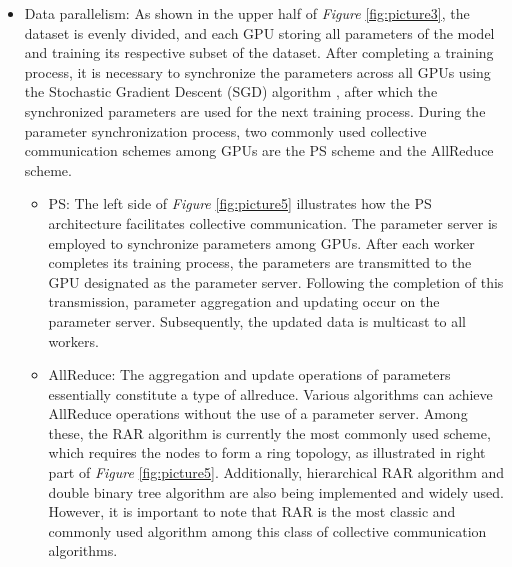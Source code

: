 \documentclass[conference]{IEEEtran}
\begin{document}
\begin{itemize}
	
	\item Data parallelism: As shown in the upper half of \emph{Figure} \ref{fig:picture3}, the dataset is evenly divided, and each GPU storing all parameters of the model and training its respective subset of the dataset. After completing a training process, it is necessary to synchronize the parameters across all GPUs using the Stochastic Gradient Descent (SGD) algorithm \cite{SGD2010}, after which the synchronized parameters are used for the next training process. During the parameter synchronization process, two commonly used collective communication schemes among GPUs are the PS scheme and the AllReduce scheme.
	
	\begin{itemize}
		
		\item PS: The left side of \emph{Figure} \ref{fig:picture5} illustrates how the PS architecture facilitates collective communication. The parameter server is employed to synchronize parameters among GPUs. After each worker completes its training process, the parameters are transmitted to the GPU designated as the parameter server. Following the completion of this transmission, parameter aggregation and updating occur on the parameter server. Subsequently, the updated data is multicast to all workers.
		
		
		\item AllReduce: The aggregation and update operations of parameters essentially constitute a type of allreduce. Various algorithms can achieve AllReduce operations without the use of a parameter server. Among these, the RAR algorithm is currently the most commonly used scheme, which requires the nodes to form a ring topology, as illustrated in right part of \emph{Figure} \ref{fig:picture5}. Additionally,  hierarchical RAR algorithm \cite{jia2018highlyscalabledeeplearning} and double binary tree algorithm \cite{Tree} are also being implemented and widely used. However, it is important to note that RAR is the most classic and commonly used algorithm among this class of collective communication algorithms.
	\end{itemize}
	

\end{itemize}
\end{document}
